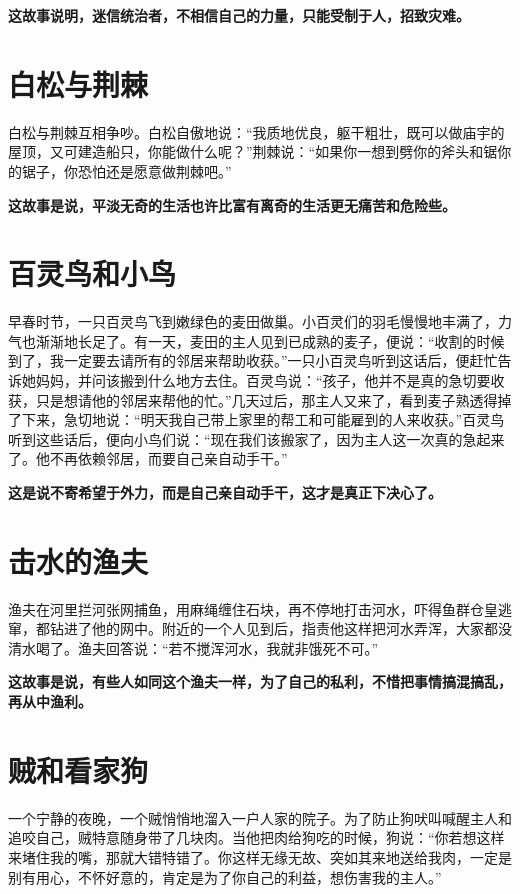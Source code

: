 {\bfseries \color{red}这故事说明，迷信统治者，不相信自己的力量，只能受制于人，招致灾难。}

\section{白松与荆棘}

白松与荆棘互相争吵。白松自傲地说：“我质地优良，躯干粗壮，既可以做庙宇的屋顶，又可建造船只，你能做什么呢？”荆棘说：“如果你一想到劈你的斧头和锯你的锯子，你恐怕还是愿意做荆棘吧。”

{\bfseries \color{red}这故事是说，平淡无奇的生活也许比富有离奇的生活更无痛苦和危险些。}

\section{百灵鸟和小鸟}

早春时节，一只百灵鸟飞到嫩绿色的麦田做巢。小百灵们的羽毛慢慢地丰满了，力气也渐渐地长足了。有一天，麦田的主人见到已成熟的麦子，便说：“收割的时候到了，我一定要去请所有的邻居来帮助收获。”一只小百灵鸟听到这话后，便赶忙告诉她妈妈，并问该搬到什么地方去住。百灵鸟说：“孩子，他并不是真的急切要收获，只是想请他的邻居来帮他的忙。”几天过后，那主人又来了，看到麦子熟透得掉了下来，急切地说：“明天我自己带上家里的帮工和可能雇到的人来收获。”百灵鸟听到这些话后，便向小鸟们说：“现在我们该搬家了，因为主人这一次真的急起来了。他不再依赖邻居，而要自己亲自动手干。”

{\bfseries \color{red}这是说不寄希望于外力，而是自己亲自动手干，这才是真正下决心了。}

\section{击水的渔夫}

渔夫在河里拦河张网捕鱼，用麻绳缠住石块，再不停地打击河水，吓得鱼群仓皇逃窜，都钻进了他的网中。附近的一个人见到后，指责他这样把河水弄浑，大家都没清水喝了。渔夫回答说：“若不搅浑河水，我就非饿死不可。”

{\bfseries \color{red}这故事是说，有些人如同这个渔夫一样，为了自己的私利，不惜把事情搞混搞乱，再从中渔利。}

\section{贼和看家狗}

一个宁静的夜晚，一个贼悄悄地溜入一户人家的院子。为了防止狗吠叫喊醒主人和追咬自己，贼特意随身带了几块肉。当他把肉给狗吃的时候，狗说：“你若想这样来堵住我的嘴，那就大错特错了。你这样无缘无故、突如其来地送给我肉，一定是别有用心，不怀好意的，肯定是为了你自己的利益，想伤害我的主人。”

